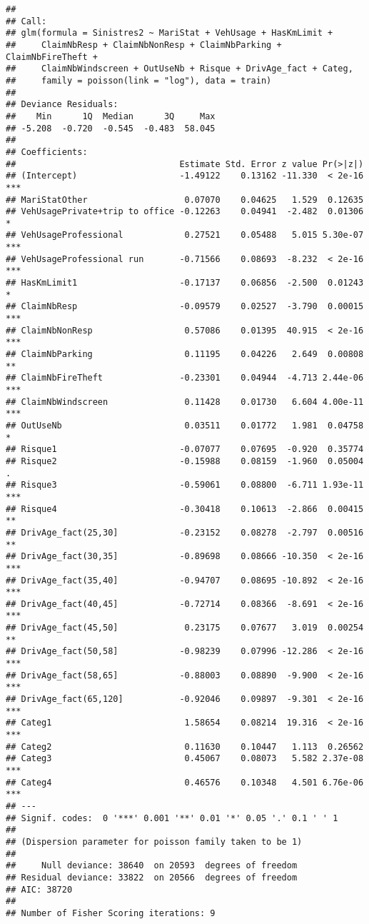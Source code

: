 \documentclass[
]{article}
\begin{document}
\begin{verbatim}
## 
## Call:
## glm(formula = Sinistres2 ~ MariStat + VehUsage + HasKmLimit + 
##     ClaimNbResp + ClaimNbNonResp + ClaimNbParking + ClaimNbFireTheft + 
##     ClaimNbWindscreen + OutUseNb + Risque + DrivAge_fact + Categ, 
##     family = poisson(link = "log"), data = train)
## 
## Deviance Residuals: 
##    Min      1Q  Median      3Q     Max  
## -5.208  -0.720  -0.545  -0.483  58.045  
## 
## Coefficients:
##                                Estimate Std. Error z value Pr(>|z|)    
## (Intercept)                    -1.49122    0.13162 -11.330  < 2e-16 ***
## MariStatOther                   0.07070    0.04625   1.529  0.12635    
## VehUsagePrivate+trip to office -0.12263    0.04941  -2.482  0.01306 *  
## VehUsageProfessional            0.27521    0.05488   5.015 5.30e-07 ***
## VehUsageProfessional run       -0.71566    0.08693  -8.232  < 2e-16 ***
## HasKmLimit1                    -0.17137    0.06856  -2.500  0.01243 *  
## ClaimNbResp                    -0.09579    0.02527  -3.790  0.00015 ***
## ClaimNbNonResp                  0.57086    0.01395  40.915  < 2e-16 ***
## ClaimNbParking                  0.11195    0.04226   2.649  0.00808 ** 
## ClaimNbFireTheft               -0.23301    0.04944  -4.713 2.44e-06 ***
## ClaimNbWindscreen               0.11428    0.01730   6.604 4.00e-11 ***
## OutUseNb                        0.03511    0.01772   1.981  0.04758 *  
## Risque1                        -0.07077    0.07695  -0.920  0.35774    
## Risque2                        -0.15988    0.08159  -1.960  0.05004 .  
## Risque3                        -0.59061    0.08800  -6.711 1.93e-11 ***
## Risque4                        -0.30418    0.10613  -2.866  0.00415 ** 
## DrivAge_fact(25,30]            -0.23152    0.08278  -2.797  0.00516 ** 
## DrivAge_fact(30,35]            -0.89698    0.08666 -10.350  < 2e-16 ***
## DrivAge_fact(35,40]            -0.94707    0.08695 -10.892  < 2e-16 ***
## DrivAge_fact(40,45]            -0.72714    0.08366  -8.691  < 2e-16 ***
## DrivAge_fact(45,50]             0.23175    0.07677   3.019  0.00254 ** 
## DrivAge_fact(50,58]            -0.98239    0.07996 -12.286  < 2e-16 ***
## DrivAge_fact(58,65]            -0.88003    0.08890  -9.900  < 2e-16 ***
## DrivAge_fact(65,120]           -0.92046    0.09897  -9.301  < 2e-16 ***
## Categ1                          1.58654    0.08214  19.316  < 2e-16 ***
## Categ2                          0.11630    0.10447   1.113  0.26562    
## Categ3                          0.45067    0.08073   5.582 2.37e-08 ***
## Categ4                          0.46576    0.10348   4.501 6.76e-06 ***
## ---
## Signif. codes:  0 '***' 0.001 '**' 0.01 '*' 0.05 '.' 0.1 ' ' 1
## 
## (Dispersion parameter for poisson family taken to be 1)
## 
##     Null deviance: 38640  on 20593  degrees of freedom
## Residual deviance: 33822  on 20566  degrees of freedom
## AIC: 38720
## 
## Number of Fisher Scoring iterations: 9
\end{verbatim}
\end{document}
